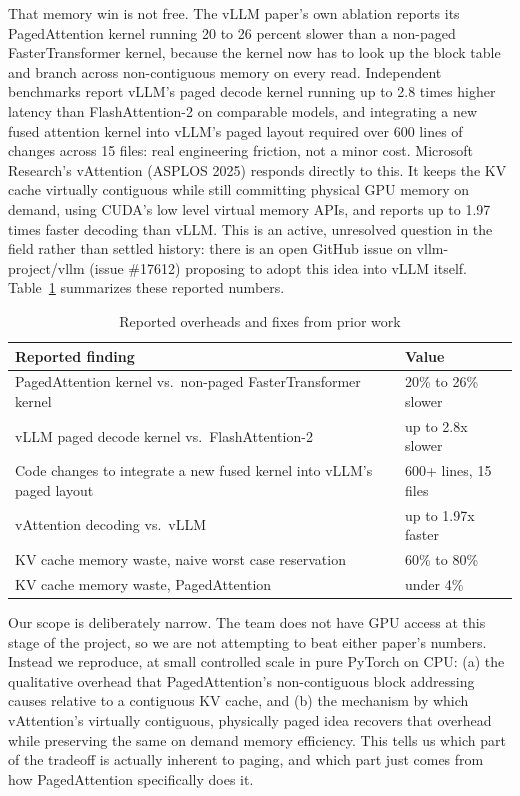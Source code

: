 \documentclass[lettersize,journal]{IEEEtran}
\begin{document}
That memory win is not free. The vLLM paper's own ablation reports its PagedAttention kernel running 20 to 26 percent slower than a non-paged FasterTransformer kernel, because the kernel now has to look up the block table and branch across non-contiguous memory on every read. Independent benchmarks report vLLM's paged decode kernel running up to 2.8 times higher latency than FlashAttention-2 on comparable models, and integrating a new fused attention kernel into vLLM's paged layout required over 600 lines of changes across 15 files: real engineering friction, not a minor cost. Microsoft Research's vAttention \cite{prabhu2024vattention} (ASPLOS 2025) responds directly to this. It keeps the KV cache virtually contiguous while still committing physical GPU memory on demand, using CUDA's low level virtual memory APIs, and reports up to 1.97 times faster decoding than vLLM. This is an active, unresolved question in the field rather than settled history: there is an open GitHub issue on vllm-project/vllm (issue \#17612) proposing to adopt this idea into vLLM itself. Table~\ref{tab:overheads} summarizes these reported numbers.

\begin{table}[!t]
\caption{Reported overheads and fixes from prior work}
\label{tab:overheads}
\centering
\begin{tabularx}{\textwidth}{@{}Xl@{}}
\toprule
\textbf{Reported finding} & \textbf{Value} \\
\midrule
PagedAttention kernel vs.\ non-paged FasterTransformer kernel \cite{kwon2023efficient} & 20\% to 26\% slower \\
vLLM paged decode kernel vs.\ FlashAttention-2 & up to 2.8x slower \\
Code changes to integrate a new fused kernel into vLLM's paged layout & 600+ lines, 15 files \\
vAttention decoding vs.\ vLLM \cite{prabhu2024vattention} & up to 1.97x faster \\
KV cache memory waste, naive worst case reservation & 60\% to 80\% \\
KV cache memory waste, PagedAttention & under 4\% \\
\bottomrule
\end{tabularx}
\end{table}

Our scope is deliberately narrow. The team does not have GPU access at this stage of the project, so we are not attempting to beat either paper's numbers. Instead we reproduce, at small controlled scale in pure PyTorch on CPU: (a) the qualitative overhead that PagedAttention's non-contiguous block addressing causes relative to a contiguous KV cache, and (b) the mechanism by which vAttention's virtually contiguous, physically paged idea recovers that overhead while preserving the same on demand memory efficiency. This tells us which part of the tradeoff is actually inherent to paging, and which part just comes from how PagedAttention specifically does it.
\end{document}
